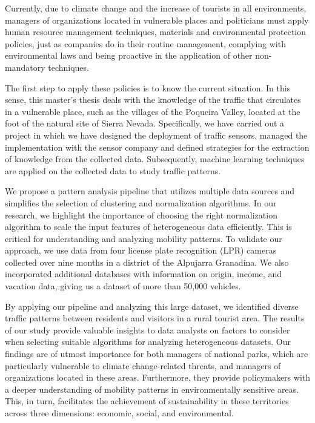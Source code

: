 
Currently, due to climate change and the increase of tourists in all environments, managers of organizations located in vulnerable places and politicians must apply human resource management techniques, materials and environmental protection policies, just as companies do in their routine management, complying with environmental laws and being proactive in the application of other non-mandatory techniques. 

The first step to apply these policies is to know the current situation. In this sense, this master's thesis deals with the knowledge of the traffic that circulates in a vulnerable place, such as the villages of the Poqueira Valley, located at the foot of the natural site of Sierra Nevada. Specifically, we have carried out a project in which we have designed the deployment of traffic sensors, managed the implementation with the sensor company and defined strategies for the extraction of knowledge from the collected data. Subsequently, machine learning techniques are applied on the collected data to study traffic patterns.

We propose a pattern analysis pipeline that utilizes multiple data sources and simplifies the selection of clustering and normalization algorithms. In our research, we highlight the importance of choosing the right normalization algorithm to scale the input features of heterogeneous data efficiently. This is critical for understanding and analyzing mobility patterns. To validate our approach, we use data from four license plate recognition (LPR) cameras collected over nine months in a district of the Alpujarra Granadina. We also incorporated additional databases with information on origin, income, and vacation data, giving us a dataset of more than 50,000 vehicles.

By applying our pipeline and analyzing this large dataset, we identified diverse traffic patterns between residents and visitors in a rural tourist area. The results of our study provide valuable insights to data analysts on factors to consider when selecting suitable algorithms for analyzing heterogeneous datasets. Our findings are of utmost importance for both managers of national parks, which are particularly vulnerable to climate change-related threats, and managers of organizations located in these areas. Furthermore, they provide policymakers with a deeper understanding of mobility patterns in environmentally sensitive areas. This, in turn, facilitates the achievement of sustainability in these territories across three dimensions: economic, social, and environmental.